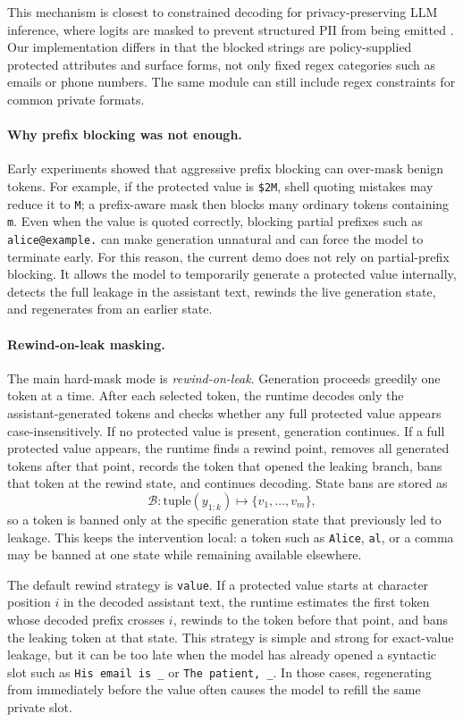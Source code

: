 This mechanism is closest to constrained decoding for privacy-preserving LLM
inference, where logits are masked to prevent structured PII from being emitted
\cite{constrained_decoding_privacy_llm}.  Our implementation differs in that the
blocked strings are policy-supplied protected attributes and surface forms, not
only fixed regex categories such as emails or phone numbers.  The same module
can still include regex constraints for common private formats.

\paragraph{Why prefix blocking was not enough.}
Early experiments showed that aggressive prefix blocking can over-mask benign
tokens.  For example, if the protected value is \texttt{\$2M}, shell quoting
mistakes may reduce it to \texttt{M}; a prefix-aware mask then blocks many
ordinary tokens containing \texttt{m}.  Even when the value is quoted correctly,
blocking partial prefixes such as \texttt{alice@example.} can make generation
unnatural and can force the model to terminate early.  For this reason, the
current demo does not rely on partial-prefix blocking.  It allows the model to
temporarily generate a protected value internally, detects the full leakage in
the assistant text, rewinds the live generation state, and regenerates from an
earlier state.

\paragraph{Rewind-on-leak masking.}
The main hard-mask mode is \emph{rewind-on-leak}.  Generation proceeds greedily
one token at a time.  After each selected token, the runtime decodes only the
assistant-generated tokens and checks whether any full protected value appears
case-insensitively.  If no protected value is present, generation continues.  If
a full protected value appears, the runtime finds a rewind point, removes all
generated tokens after that point, records the token that opened the leaking
branch, bans that token at the rewind state, and continues decoding.  State bans
are stored as
\[
    \mathcal{B}: \mathrm{tuple}(y_{1:k}) \mapsto \{v_1,\ldots,v_m\},
\]
so a token is banned only at the specific generation state that previously led
to leakage.  This keeps the intervention local: a token such as
\texttt{Alice}, \texttt{al}, or a comma may be banned at one state while
remaining available elsewhere.

The default rewind strategy is \texttt{value}.  If a protected value starts at
character position $i$ in the decoded assistant text, the runtime estimates the
first token whose decoded prefix crosses $i$, rewinds to the token before that
point, and bans the leaking token at that state.  This strategy is simple and
strong for exact-value leakage, but it can be too late when the model has
already opened a syntactic slot such as \texttt{His email is \_} or
\texttt{The patient, \_}.  In those cases, regenerating from immediately before
the value often causes the model to refill the same private slot.


